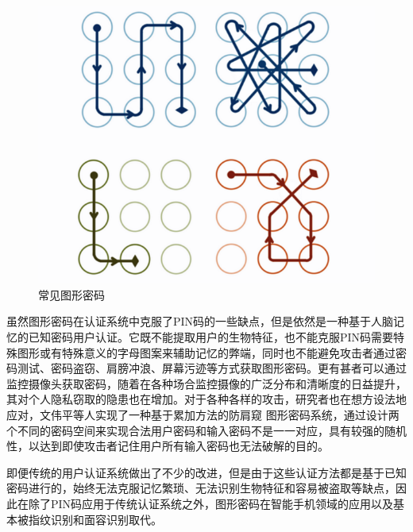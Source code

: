 \begin{figure}[htbp]
  \centering
  \includegraphics[width=0.5\linewidth]{images/G.jpeg}
  \caption{常见图形密码}\label{1-2} %
\end{figure}
\par
{虽然图形密码在认证系统中克服了PIN码的一些缺点，但是依然是一种基于人脑记忆的已知密码用户认证。它既不能提取用户的生物特征，也不能克服PIN码需要特殊图形或有特殊意义的字母图案来辅助记忆的弊端，同时也不能避免攻击者通过密码测试、密码盗窃、肩膀冲浪\cite{2014Shoulder}、屏幕污迹等方式获取图形密码。更有甚者可以通过监控摄像头获取密码，随着在各种场合监控摄像的广泛分布和清晰度的日益提升，其对个人隐私窃取的隐患也在增加\cite{2022qiu}。对于各种各样的攻击，研究者也在想方设法地应对，文伟平等人实现了一种基于累加方法的防肩窥
图形密码系统\cite{2009wen}，通过设计两个不同的密码空间来实现合法用户密码和输入密码不是一一对应，具有较强的随机性，以达到即使攻击者记住用户所有输入密码也无法破解的目的。
}
\par
{即便传统的用户认证系统做出了不少的改进，但是由于这些认证方法都是基于已知密码进行的，始终无法克服记忆繁琐、无法识别生物特征和容易被盗取等缺点，因此在除了PIN码应用于传统认证系统之外，图形密码在智能手机领域的应用以及基本被指纹识别和面容识别取代。}
